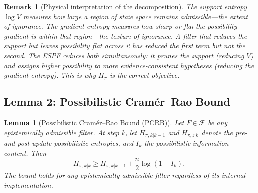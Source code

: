 \documentclass[12pt]{article}
\newtheorem{lemma}[theorem]{Lemma}
\newtheorem{remark}[theorem]{Remark}
\begin{document}
\begin{remark}[Physical interpretation of the decomposition]
The support entropy $\log V$ measures how large a region of state space remains admissible---the extent of ignorance. The gradient entropy measures how sharp or flat the possibility gradient is within that region---the texture of ignorance. A filter that reduces the support but leaves possibility flat across it has reduced the first term but not the second. The ESPF reduces both simultaneously: it prunes the support (reducing $V$) and assigns higher possibility to more evidence-consistent hypotheses (reducing the gradient entropy). This is why $H_\pi$ is the correct objective.
\end{remark}

\subsection{Lemma 2: Possibilistic Cram\'{e}r--Rao Bound}

\begin{lemma}[Possibilistic Cram\'{e}r--Rao Bound (PCRB)]
Let $F \in \mathcal{F}$ be any epistemically admissible filter. At step $k$, let $H_{\pi,k|k-1}$ and $H_{\pi,k|k}$ denote the pre- and post-update possibilistic entropies, and
$I_k$ the possibilistic information content. Then
\begin{equation}
H_{\pi,k|k} \geq H_{\pi,k|k-1} + \frac{n}{2}\log(1 - I_k).
\end{equation}
The bound holds for any epistemically admissible filter regardless of its internal implementation.
\end{lemma}
\end{document}
